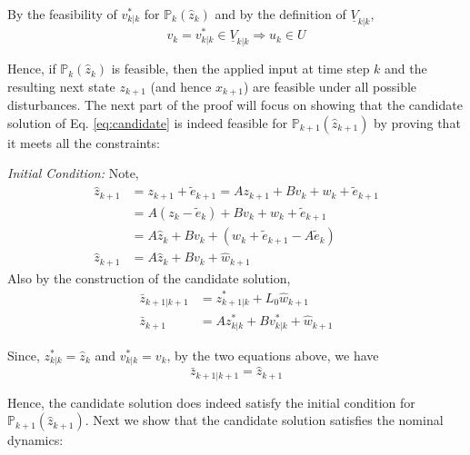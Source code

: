 By the feasibility of $v^{*}_{k|k}$ for $\mathbb{P}_{k}(\hat{z}_k)$ and by the definition of $\underline{V}_{k|k}$,
\begin{equation}
v_k = v^{*}_{k|k} \in \underline{V}_{k|k} \Rightarrow u_k \in U
\end{equation}

Hence, if $\mathbb{P}_{k}(\hat{z}_k)$ is feasible, then the applied input at time step $k$ and the resulting next state $z_{k+1}$ (and hence $x_{k+1}$) are feasible under all possible disturbances. 
The next part of the proof will focus on showing that the candidate solution of Eq. \ref{eq:candidate} is indeed feasible for $\mathbb{P}_{k+1}(\hat{z}_{k+1})$ by proving that it meets all the constraints:

\textit{Initial Condition:} Note,
\begin{subequations}
\begin{align}
\hat{z}_{k+1} &= z_{k+1} + \tilde{e}_{k+1} = Az_{k+1} + Bv_k +w_k +\tilde{e}_{k+1} \\
&= A(z_k-\tilde{e}_k) + Bv_k + w_k +\tilde{e}_{k+1} \\
&= A\hat{z}_k + Bv_k + (w_k + \tilde{e}_{k+1} -A\tilde{e}_k)  \\
\hat{z}_{k+1}&=A\hat{z}_k + Bv_k + \hat{w}_{k+1}
\end{align}
\end{subequations}
Also by the construction of the candidate solution,
\begin{subequations}
\begin{align}
\bar{z}_{k+1|k+1} &= z^{*}_{k+1|k} + L_0 \hat{w}_{k+1} \\
\bar{z}_{k+1} &= Az^{*}_{k|k} + Bv^{*}_{k|k} + \hat{w}_{k+1}
\end{align}
\end{subequations}

Since, $z^{*}_{k|k}=\hat{z}_k$ and $v^{*}_{k|k} = v_k$, by the two equations above, we have
\begin{equation}
\bar{z}_{k+1|k+1} = \hat{z}_{k+1}
\end{equation}

Hence, the candidate solution does indeed satisfy the initial condition for $\mathbb{P}_{k+1}(\hat{z}_{k+1})$. Next we show that the candidate solution satisfies the nominal dynamics:

